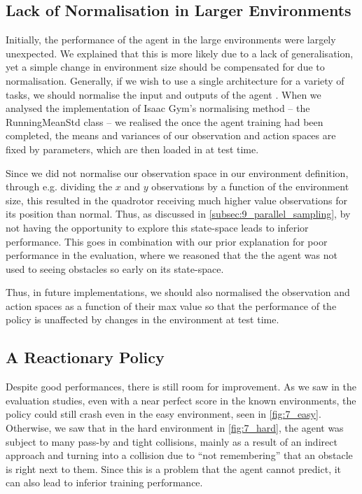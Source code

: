 \subsection{Lack of Normalisation in Larger Environments}
Initially, the performance of the agent in the large environments were largely unexpected. We explained that this is more likely due to a lack of generalisation, yet a simple change in environment size should be compensated for due to normalisation. Generally, if we wish to use a single architecture for a variety of tasks, we should normalise the input and outputs of the agent \cite{DDPG}. When we analysed the implementation of Isaac Gym's normalising method -- the RunningMeanStd class -- we realised the once the agent training had been completed, the means and variances of our observation and action spaces are fixed by parameters, which are then loaded in at test time.

Since we did not normalise our observation space in our environment definition, through e.g. dividing the $x$ and $y$ observations by a function of the environment size, this resulted in the quadrotor receiving much higher value observations for its position than normal. Thus, as discussed in \cref{subsec:9_parallel_sampling}, by not having the opportunity to explore this state-space leads to inferior performance. This goes in combination with our prior explanation for poor performance in the evaluation, where we reasoned that the the agent was not used to seeing obstacles so early on its state-space. 

Thus, in future implementations, we should also normalised the observation and action spaces as a function of their max value so that the performance of the policy is unaffected by changes in the environment at test time. 


\subsection{A Reactionary Policy}
Despite good performances, there is still room for improvement. As we saw in the evaluation studies, even with a near perfect score in the known environments, the policy could still crash even in the easy environment, seen in \cref{fig:7_easy}. Otherwise, we saw that in the hard environment in \cref{fig:7_hard}, the agent was subject to many pass-by and tight collisions, mainly as a result of an indirect approach and turning into a collision due to ``not remembering'' that an obstacle is right next to them. Since this is a problem that the agent cannot predict, it can also lead to inferior training performance.

